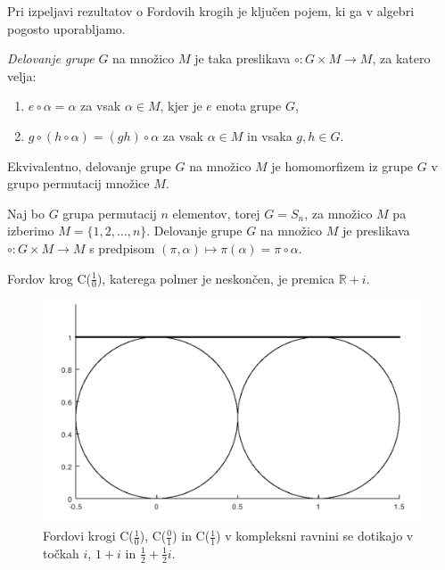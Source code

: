 \documentclass[mat1]{fmfdelo}
\begin{document}
Pri izpeljavi rezultatov o Fordovih krogih je ključen pojem, ki ga v algebri pogosto uporabljamo.

\begin{definicija}
\emph{Delovanje grupe} $G$ na množico $M$ je taka preslikava \( \circ \colon G \times M \rightarrow M \), za katero velja:
\begin{enumerate}
	\item \( e \circ \alpha = \alpha \) za vsak $ \alpha \in M$, kjer je $e$ enota grupe $G$, 
	\item \( g \circ (h \circ \alpha) = (gh) \circ \alpha \) za vsak $\alpha \in M$ in vsaka $g,h \in G$.
\end{enumerate}

Ekvivalentno, delovanje grupe $G$ na množico $M$ je homomorfizem iz grupe $G$ v grupo permutacij množice $M$.
\end{definicija}

\begin{primer}
Naj bo $G$ grupa permutacij $n$ elementov, torej $G = S_{n}$, za množico $M$ pa izberimo $M = \{1,2, \ldots, n \}$.
Delovanje grupe $G$ na množico $M$ je preslikava \( \circ \colon G \times M \rightarrow M \) s predpisom \( (\pi, \alpha) \mapsto \pi(\alpha) = \pi \circ \alpha \).
\end{primer}

\begin{definicija}
Fordov krog C($\frac{1}{0}$), katerega polmer je neskončen, je premica $\mathbb{R} + i$.
\end{definicija}

\begin{figure}[h!]
\begin{center}
\includegraphics[scale=0.5]{fordovi_v_kompleksnem.png}
\caption{Fordovi krogi C($\frac{1}{0}$), C($\frac{0}{1}$) in C($\frac{1}{1}$) v kompleksni ravnini se dotikajo v točkah $i$, $1+i$ in $\frac{1}{2}+\frac{1}{2} i$.}
\end{center}
\end{figure}
\end{document}
